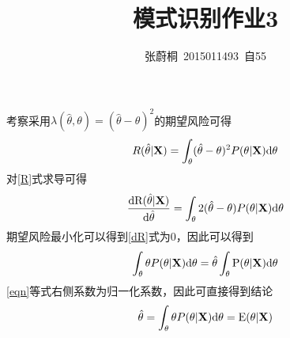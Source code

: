 \documentclass[UTF8,a4paper]{ctexart}
\title{模式识别作业3}
\author{张蔚桐\ 2015011493\ 自55}
\begin{document}
\maketitle
\section{}
考察采用$\lambda(\hat{\theta},\theta)=(\hat{\theta}-\theta)^2$的期望风险可得
\begin{equation}
R(\hat{\theta}|\mathbf{X})=\int_\theta(\hat{\theta}-\theta)^2P(\theta|\mathbf{X})\rm{d}\theta
\label{R}
\end{equation}
 对\ref{R}式求导可得
\begin{equation}
\frac{\rm{d}R(\hat{\theta}|\mathbf{X})}{\rm{d}\hat{\theta}}=\int_\theta2(\hat{\theta}-\theta)P(\theta|\mathbf{X})\rm{d}\theta
\label{dR}
\end{equation}
期望风险最小化可以得到\ref{dR}式为0，因此可以得到
\begin{equation}
\int_\theta\theta P(\theta|\mathbf{X})\rm{d}\theta=\hat{\theta} \int_\theta{P(\theta|\mathbf{X})\rm{d}\theta}
\label{eqn}
\end{equation}
\ref{eqn}等式右侧系数为归一化系数，因此可直接得到结论
\begin{equation}
\hat{\theta}=\int_\theta\theta P(\theta|\mathbf{X})\rm{d}\theta=E(\theta|\mathbf{X})
\label{eqn}
\end{equation}
\section{}
\end{document}
